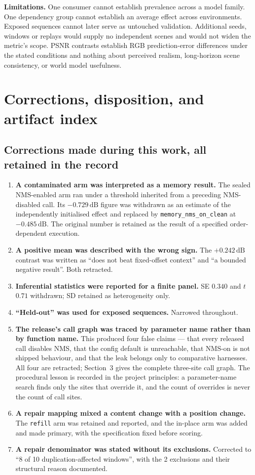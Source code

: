 \documentclass[11pt,a4paper]{article}
\newcommand{\code}[1]{\texttt{\small #1}}
\newcommand{\dB}{\,\mathrm{dB}}
\begin{document}
\textbf{Limitations.} One consumer cannot establish prevalence across a model family. One dependency
group cannot establish an average effect across environments. Exposed sequences cannot later serve as
untouched validation. Additional seeds, windows or replays would supply no independent scenes and
would not widen the metric's scope. PSNR contrasts establish RGB prediction-error differences under
the stated conditions and nothing about perceived realism, long-horizon scene consistency, or world
model usefulness.

\section{Corrections, disposition, and artifact index}
\label{sec:corrections}

\subsection{Corrections made during this work, all retained in the record}

\begin{enumerate}
\item \textbf{A contaminated arm was interpreted as a memory result.} The sealed NMS-enabled arm ran
under a threshold inherited from a preceding NMS-disabled call. Its $-0.729\dB$ figure was withdrawn
as an estimate of the independently initialised effect and replaced by \code{memory\_nms\_on\_clean}
at $-0.485\dB$. The original number is retained as the result of a specified order-dependent
execution.
\item \textbf{A positive mean was described with the wrong sign.} The $+0.242\dB$ contrast was
written as ``does not beat fixed-offset context'' and ``a bounded negative result''. Both retracted.
\item \textbf{Inferential statistics were reported for a finite panel.} SE $0.340$ and $t$ $0.71$
withdrawn; SD retained as heterogeneity only.
\item \textbf{``Held-out'' was used for exposed sequences.} Narrowed throughout.
\item \textbf{The release's call graph was traced by parameter name rather than by function name.}
This produced four false claims --- that every released call disables NMS, that the config default is
unreachable, that NMS-on is not shipped behaviour, and that the leak belongs only to comparative
harnesses. All four are retracted; Section~3 gives the complete three-site call graph. The procedural
lesson is recorded in the project principles: a parameter-name search finds only the sites that
override it, and the count of overrides is never the count of call sites.
\item \textbf{A repair mapping mixed a content change with a position change.} The \code{refill} arm
was retained and reported, and the in-place arm was added and made primary, with the specification
fixed before scoring.
\item \textbf{A repair denominator was stated without its exclusions.} Corrected to ``8 of 10
duplication-affected windows'', with the 2 exclusions and their structural reason documented.
\end{enumerate}
\end{document}
